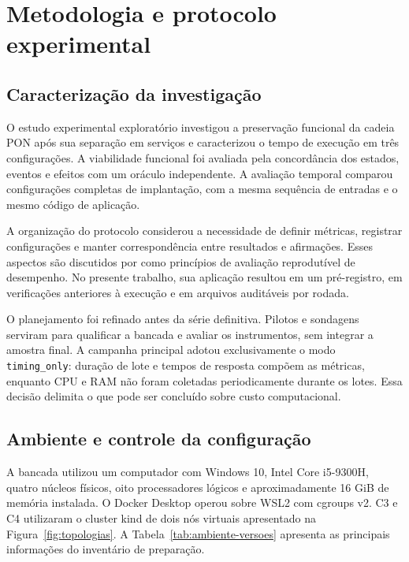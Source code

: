 \chapter{Metodologia e protocolo experimental}
\label{cap:metodologia-tcc2}

\section{Caracterização da investigação}

O estudo experimental exploratório investigou a preservação funcional da cadeia PON após sua separação em serviços e caracterizou o tempo de execução em três configurações. A viabilidade funcional foi avaliada pela concordância dos estados, eventos e efeitos com um oráculo independente. A avaliação temporal comparou configurações completas de implantação, com a mesma sequência de entradas e o mesmo código de aplicação.

A organização do protocolo considerou a necessidade de definir métricas, registrar configurações e manter correspondência entre resultados e afirmações. Esses aspectos são discutidos por  como princípios de avaliação reprodutível de desempenho. No presente trabalho, sua aplicação resultou em um pré-registro, em verificações anteriores à execução e em arquivos auditáveis por rodada.

O planejamento foi refinado antes da série definitiva. Pilotos e sondagens serviram para qualificar a bancada e avaliar os instrumentos, sem integrar a amostra final. A campanha principal adotou exclusivamente o modo \texttt{timing\_only}: duração de lote e tempos de resposta compõem as métricas, enquanto CPU e RAM não foram coletadas periodicamente durante os lotes. Essa decisão delimita o que pode ser concluído sobre custo computacional.

\section{Ambiente e controle da configuração}

A bancada utilizou um computador com Windows 10, Intel Core i5-9300H, quatro núcleos físicos, oito processadores lógicos e aproximadamente 16 GiB de memória instalada. O Docker Desktop operou sobre WSL2 com cgroups v2. C3 e C4 utilizaram o cluster kind de dois nós virtuais apresentado na Figura~\ref{fig:topologias}. A Tabela~\ref{tab:ambiente-versoes} apresenta as principais informações do inventário de preparação.

